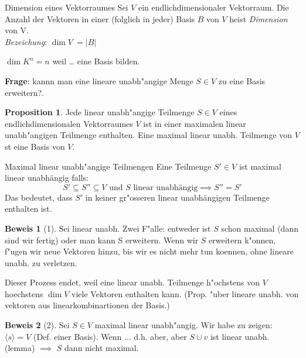 \documentclass[oneside,fontsize=11pt,paper=a4,BCOR=0mm,DIV=12,automark,headsepline]{scrbook}
\theoremstyle{remark}
\theoremstyle{definition}
\newtheorem*{proposition}{Proposition}
\theoremstyle{definition}
\newtheorem*{prof}{Beweis}
\theoremstyle{remark}
\begin{document}
\begin{definition}{Dimension eines Vektorraumes}{}
  Sei \(V\) ein endlichdimensionaler Vektorraum. Die Anzahl der Vektoren in einer
  (folglich in jeder) Basis $B$ von \(V\) heist \emph{Dimension} von V. \\
  \emph{Bezeichung}: \(\dim V\ = |B|\)
\end{definition}

\begin{exa}[s]
  \(\dim K^{n}=n\) weil \ldots{} eine Basis bilden. 
\end{exa}

\textbf{Frage}: kannn man eine lineare unabh"angige Menge \(S\in V\) zu eine Basis
erweitern?.

\begin{proposition}
  Jede linear unabh"angige Teilmenge \(S\in V\) eines
  endlichdimensionalen Vektorraumes \(V\) ist in einer maximalen linear
  unabh"angigen Teilmenge enthalten. Eine maximal linear unabh. Teilmenge von \(V\)
  st eine Basis von \(V\).
\end{proposition}


\begin{definition}{Maximal linear unabh"angige Teilmengen}{}
  Eine Teilmenge \(S'\in V\) ist maximal linear unabhängig falls:
  \[S'\subseteq S'' \subseteq V \text{ und } S \text{ linear unabhängig}\implies S'' = S'\]
  Das bedeutet, dass $S'$ in keiner gr"osseren linear unabhängigen Teilmenge enthalten ist.
\end{definition}

\begin{prof}[1]
  Sei linear unabh.
  Zwei F"alle: entweder ist \(S\) schon maximal (dann sind wir fertig) oder man kann
  S erweitern. Wenn wir \(S\) erweitern k"onnen, f"ugen wir neue Vektoren hinzu, bis
  wir es nicht mehr tun koennen, ohne lineare unabh. zu verletzen.

  Dieser Prozess endet, weil eine linear unabh. Teilmenge h"ochstens von \(V\)
  hoechstens \(\dim V\) viele Vektoren enthalten kann. (Prop. "uber lineare unabh.
  von vektoren aus linearkombinartionen der Basis.)
\end{prof}

\begin{prof}[2]
  Sei \(S\in V\) maximal linear unabh"angig. Wir habe zu zeigen: \(\langle s \rangle=V\) (Def. einer
  Basis). Wenn $\ldots{}$ d.h. aber, aber \(S\cup {v}\) ist linear unabh. (lemma) $\implies$
  \(S\) dann nicht maximal.
\end{prof}
\end{document}
